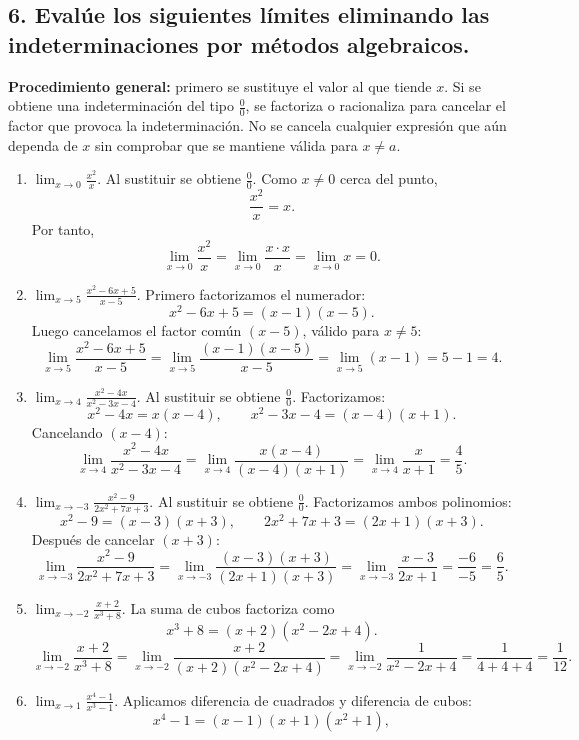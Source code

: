 \documentclass[12pt, letterpaper]{article}
\makeatletter
\renewcommand{\alph}[1]{\expandafter\@alphlatin\csname c@#1\endcsname}
\newcommand{\@alphlatin}[1]{\ifcase#1\or a\or b\or c\or d\or e\or f\or g\or h\or i\or j\or k\or l\or m\or n\or o\or p\or q\or r\or s\or t\or u\or v\or w\or x\or y\or z\else\@ctrerr\fi}
\makeatother
\begin{document}
\subsection*{6. Evalúe los siguientes límites eliminando las indeterminaciones por métodos algebraicos.}
\textbf{Procedimiento general:} primero se sustituye el valor al que tiende $x$. Si se obtiene una indeterminación del tipo $\frac00$, se factoriza o racionaliza para cancelar el factor que provoca la indeterminación. No se cancela cualquier expresión que aún dependa de $x$ sin comprobar que se mantiene válida para $x\neq a$.
\begin{enumerate}[label=\alph*)]
  \item $\displaystyle\lim_{x\to0}\frac{x^2}{x}$. Al sustituir se obtiene $\frac00$. Como $x\neq0$ cerca del punto,
  \[
  \frac{x^2}{x}=x.
  \]
  Por tanto,
  \[
  \lim_{x\to0}\frac{x^2}{x}
  =\lim_{x\to0}\frac{x\cdot x}{x}
  =\lim_{x\to0}x
  =\boxed{0}.
  \]
  \item $\displaystyle\lim_{x\to5}\frac{x^2-6x+5}{x-5}$. Primero factorizamos el numerador:
  \[
  x^2-6x+5=(x-1)(x-5).
  \]
  Luego cancelamos el factor común $(x-5)$, válido para $x\neq5$:
  \[
  \lim_{x\to5}\frac{x^2-6x+5}{x-5}
  =\lim_{x\to5}\frac{(x-1)(x-5)}{x-5}
  =\lim_{x\to5}(x-1)
  =5-1=\boxed{4}.
  \]
  \item $\displaystyle\lim_{x\to4}\frac{x^2-4x}{x^2-3x-4}$. Al sustituir se obtiene $\frac00$. Factorizamos:
  \[
  x^2-4x=x(x-4),
  \qquad
  x^2-3x-4=(x-4)(x+1).
  \]
  Cancelando $(x-4)$:
  \[
  \lim_{x\to4}\frac{x^2-4x}{x^2-3x-4}
  =\lim_{x\to4}\frac{x(x-4)}{(x-4)(x+1)}
  =\lim_{x\to4}\frac{x}{x+1}
  =\frac45.
  \]
  \item $\displaystyle\lim_{x\to-3}\frac{x^2-9}{2x^2+7x+3}$. Al sustituir se obtiene $\frac00$. Factorizamos ambos polinomios:
  \[
  x^2-9=(x-3)(x+3),
  \qquad
  2x^2+7x+3=(2x+1)(x+3).
  \]
  Después de cancelar $(x+3)$:
  \[
  \lim_{x\to-3}\frac{x^2-9}{2x^2+7x+3}
  =\lim_{x\to-3}\frac{(x-3)(x+3)}{(2x+1)(x+3)}
  =\lim_{x\to-3}\frac{x-3}{2x+1}
  =\frac{-6}{-5}=\boxed{\frac65}.
  \]
  \item $\displaystyle\lim_{x\to-2}\frac{x+2}{x^3+8}$. La suma de cubos factoriza como
  \[
  x^3+8=(x+2)(x^2-2x+4).
  \]
  \[
  \lim_{x\to-2}\frac{x+2}{x^3+8}
  =\lim_{x\to-2}\frac{x+2}{(x+2)(x^2-2x+4)}
  =\lim_{x\to-2}\frac1{x^2-2x+4}
  =\frac1{4+4+4}=\boxed{\frac1{12}}.
  \]
  \item $\displaystyle\lim_{x\to1}\frac{x^4-1}{x^3-1}$. Aplicamos diferencia de cuadrados y diferencia de cubos:
  \[
  x^4-1=(x-1)(x+1)(x^2+1),
\]
\end{enumerate}
\end{document}
